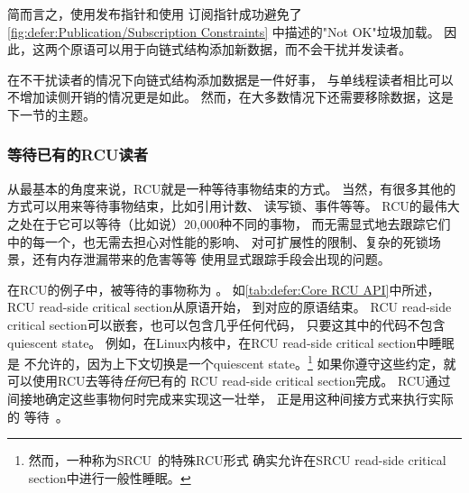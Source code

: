 简而言之，使用发布指针和使用
订阅指针成功避免了
\cref{fig:defer:Publication/Subscription Constraints}
中描述的"Not OK"垃圾加载。
因此，这两个原语可以用于向链式结构添加新数据，而不会干扰并发读者。

\QuickQuizEnd

在不干扰读者的情况下向链式结构添加数据是一件好事，
与单线程读者相比可以不增加读侧开销的情况更是如此。
然而，在大多数情况下还需要移除数据，这是下一节的主题。

\subsubsection{等待已有的RCU读者}
\label{sec:defer:Wait For Pre-Existing RCU Readers}

从最基本的角度来说，RCU就是一种等待事物结束的方式。
当然，有很多其他的方式可以用来等待事物结束，比如引用计数、
读写锁、事件等等。
RCU的最伟大之处在于它可以等待（比如说）20,000种不同的事物，
而无需显式地去跟踪它们中的每一个，也无需去担心对性能的影响、
对可扩展性的限制、复杂的死锁场景，还有内存泄漏带来的危害等等
使用显式跟踪手段会出现的问题。

在RCU的例子中，被等待的事物称为
\emph{}。
如\cref{tab:defer:Core RCU API}中所述，
RCU read-side critical section从原语开始，
到对应的原语结束。
RCU read-side critical section可以嵌套，也可以包含几乎任何代码，
只要这其中的代码不包含quiescent state。
例如，在Linux内核中，在RCU read-side critical section中睡眠是
不允许的，因为上下文切换是一个quiescent state。\footnote{
	然而，一种称为SRCU~\cite{PaulEMcKenney2006c}的特殊RCU形式
	确实允许在SRCU read-side critical section中进行一般性睡眠。}
如果你遵守这些约定，就可以使用RCU去等待\emph{任何}已有的
RCU read-side critical section完成。
RCU通过间接地确定这些事物何时完成来实现这一壮举，
正是用这种间接方式来执行实际的
等待~\cite{MathieuDesnoyers2012URCU,McKenney:2013:SDS:2483852.2483867}。

